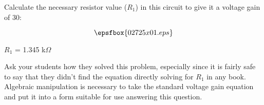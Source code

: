 

Calculate the necessary resistor value ($R_1$) in this circuit to give it a voltage gain of 30:

$$\epsfbox{02725x01.eps}$$







$R_1$ = 1.345 k$\Omega$







Ask your students how they solved this problem, especially since it is fairly safe to say that they didn't find the equation directly solving for $R_1$ in any book.  Algebraic manipulation is necessary to take the standard voltage gain equation and put it into a form suitable for use answering this question.





